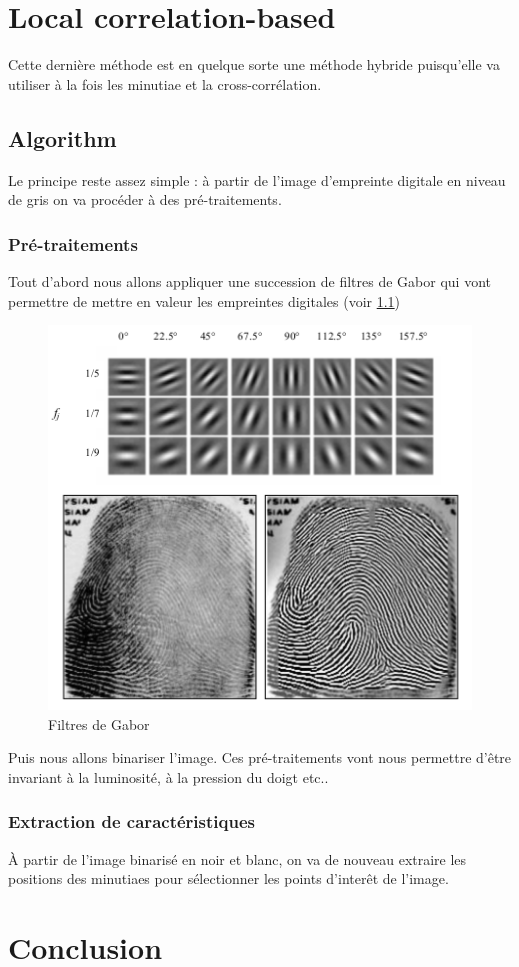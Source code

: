 \documentclass{report}
\begin{document}
\chapter{Local correlation-based}

Cette dernière méthode est en quelque sorte une méthode hybride
puisqu'elle va utiliser à la fois les minutiae et la
cross-corrélation.

\section{Algorithm}

Le principe reste assez simple : à partir de l'image d'empreinte
digitale en niveau de gris on va procéder à des pré-traitements.

\subsection{Pré-traitements}

Tout d'abord nous allons appliquer une succession de filtres de Gabor
qui vont permettre de mettre en valeur les empreintes digitales (voir \ref{fig:gabor})

\begin{figure}[H]
  \centering\includegraphics{filters.png}
  \caption{Filtres de Gabor}
  \label{fig:gabor}
\end{figure}

Puis nous allons binariser l'image.  Ces pré-traitements vont nous
permettre d'être invariant à la luminosité, à la pression du doigt
etc..

\subsection{Extraction de caractéristiques}

\`A partir de l'image binarisé en noir et blanc, on va de nouveau
extraire les positions des minutiaes pour sélectionner les points
d'interêt de l'image.

\chapter{Conclusion}



\nocite{david}

\end{document}
